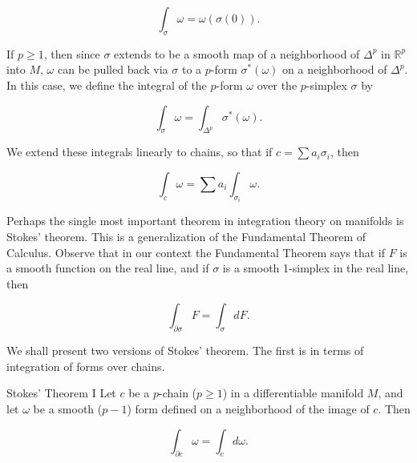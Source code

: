 \begin{equation}
\tag{8}\label{eq:4.6:8}
\int_{\sigma}\omega=\omega\left(\sigma(0)\right).
\end{equation}

If $p \geq 1$, then since $\sigma$ extends to be a smooth map of a neighborhood of $\Delta^p$ in $\mathbb{R}^p$ into $M$, $\omega$ can be pulled back via $\sigma$ to a $p$-form $\sigma^{*}(\omega)$ on a neighborhood of $\Delta^p$. In this case, we define the integral of the $p$-form $\omega$ over the $p$-simplex $\sigma$ by

\begin{equation}
\tag{9}\label{eq:4.6:9}
\int_{\sigma}\omega=\int_{\Delta^{p}}\sigma^{*}(\omega).
\end{equation}

We extend these integrals linearly to chains, so that if  $ c = \sum a_i \sigma_i $, then

\begin{equation}
\tag{10}\label{eq:4.6:10}
\int_{c}\omega=\sum a_{i}\int_{\sigma_{i}}\omega.
\end{equation}

Perhaps the single most important theorem in integration theory on manifolds is Stokes' theorem. This is a generalization of the Fundamental Theorem of Calculus. Observe that in our context the Fundamental Theorem says that if $F$ is a smooth function on the real line, and if $\sigma$ is a smooth 1-simplex in the real line, then

\begin{equation}
\tag{11}\label{eq:4.6:11}
\int_{\partial\sigma}F=\int_{\sigma}dF.
\end{equation}

We shall present two versions of Stokes' theorem. The first is in terms of integration of forms over chains. 

\begin{theorem}{Stokes' Theorem I}\label{thm:4.7}
Let $c$ be a $p$-chain ($p \geq 1$) in a differentiable manifold $M$, and let $\omega$ be a smooth ($p-1$) form defined on a neighborhood of the image of $c$. Then

\begin{equation}
\tag{1}\label{eq:4.7:1}
\int_{\partial c}\omega=\int_{c}d\omega.
\end{equation}

\end{theorem}

